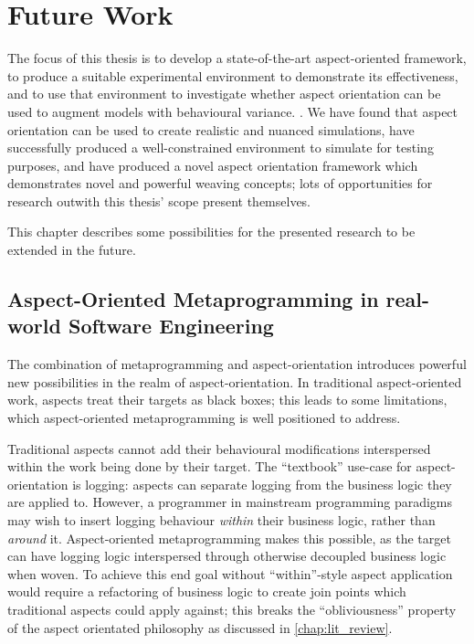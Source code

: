 \chapter{Future Work}\label{chap:future_work}

The focus of this thesis is to develop a state-of-the-art aspect-oriented
framework, to produce a suitable experimental environment to demonstrate its
effectiveness, and to use that environment to investigate whether aspect
orientation can be used to augment models with behavioural variance. . We
have found that aspect orientation can be used to create realistic and nuanced
simulations, have successfully produced a well-constrained environment to
simulate for testing purposes, and have produced a novel aspect orientation
framework which demonstrates novel and powerful weaving concepts; lots of
opportunities for research outwith this thesis' scope present themselves.

This chapter describes some possibilities for the presented research to be
extended in the future.


\section{Aspect-Oriented Metaprogramming in real-world Software Engineering}
\label{future_work_aspect_oriented_metaprogramming}

The combination of metaprogramming and aspect-orientation introduces powerful
new possibilities in the realm of aspect-orientation. In traditional
aspect-oriented work, aspects treat their targets as black boxes; this leads to
some limitations, which aspect-oriented metaprogramming is well positioned to
address.

Traditional aspects cannot add their behavioural modifications interspersed
within the work being done by their target. The ``textbook'' use-case for
aspect-orientation is logging: aspects can separate logging from the business
logic they are applied to. However, a programmer in mainstream programming
paradigms may wish to insert logging behaviour \emph{within} their business
logic, rather than \emph{around} it. Aspect-oriented metaprogramming makes this
possible, as the target can have logging logic interspersed through otherwise
decoupled business logic when woven. To achieve this end goal without
``within''-style aspect application would require a refactoring of business
logic to create join points which traditional aspects could apply against; this
breaks the ``obliviousness'' property of the aspect orientated philosophy as
discussed in \cref{chap:lit_review}.


